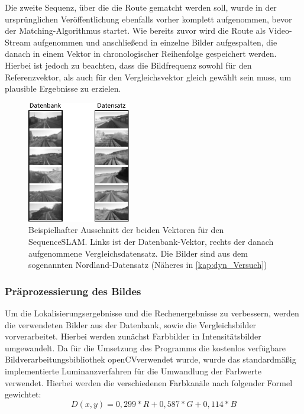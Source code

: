 \documentclass[12pt,a4paper,titlepage]{scrartcl}
\begin{document}
Die zweite Sequenz, über die die Route gematcht werden soll, wurde in der ursprünglichen Veröffentlichung ebenfalls vorher komplett aufgenommen, bevor der Matching-Algorithmus startet. Wie bereits zuvor wird die Route als Video-Stream aufgenommen und anschließend in einzelne Bilder aufgespalten, die danach in einem Vektor in chronologischer Reihenfolge gespeichert werden. Hierbei ist jedoch zu beachten, dass die Bildfrequenz sowohl für den Referenzvektor, als auch für den Vergleichsvektor gleich gewählt sein muss, um plausible Ergebnisse zu erzielen.

\begin{figure}[!h]
	\centering
	\includegraphics[width=0.4\textwidth]{../Bilder/Bildvektoren.pdf}
	\caption[Bildvektoren für den SequenceSLAM]{Beispielhafter Ausschnitt der beiden Vektoren für den SequenceSLAM. Links ist der Datenbank-Vektor, rechts der danach aufgenommene Vergleichsdatensatz. Die Bilder sind aus dem sogenannten Nordland-Datensatz (Näheres in \autoref{kap:dyn_Versuch})}
	\label{img:vec_ex}
\end{figure}
\subsubsection{Präprozessierung des Bildes}
Um die Lokalisierungsergebnisse und die Rechenergebnisse zu verbessern, werden die verwendeten Bilder aus der Datenbank, sowie die Vergleichsbilder vorverarbeitet. Hierbei werden zunächst Farbbilder in Intensitätsbilder umgewandelt. Da für die Umsetzung des Programms die kostenlos verfügbare Bildverarbeitungsbibliothek \glqq openCV\grqq verwendet wurde, wurde das standardmäßig implementierte Luminanzverfahren für die Umwandlung der Farbwerte verwendet. Hierbei werden die verschiedenen Farbkanäle nach folgender Formel gewichtet:
\begin{equation}
D(x,y)=0{,}299*R+0{,}587*G+0{,}114*B
\end{equation}
\end{document}
